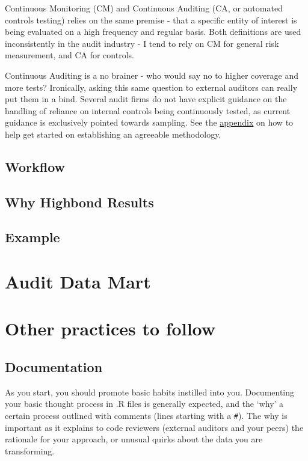 \documentclass[
]{book}
\begin{document}
Continuous Monitoring (CM) and Continuous Auditing (CA, or automated controls testing) relies on the same premise - that a specific entity of interest is being evaluated on a high frequency and regular basis. Both definitions are used inconsistently in the audit industry - I tend to rely on CM for general risk measurement, and CA for controls.

Continuous Auditing is a no brainer - who would say no to higher coverage and more tests? Ironically, asking this same question to external auditors can really put them in a bind. Several audit firms do not have explicit guidance on the handling of reliance on internal controls being continuously tested, as current guidance is exclusively pointed towards sampling. See the \protect\hyperlink{appendixct}{appendix} on how to help get started on establishing an agreeable methodology.

\hypertarget{workflow}{%
\section{Workflow}\label{workflow}}

\hypertarget{why-highbond-results}{%
\section{Why Highbond Results}\label{why-highbond-results}}

\hypertarget{example}{%
\section{Example}\label{example}}

\hypertarget{applied-adw}{%
\chapter{Audit Data Mart}\label{applied-adw}}

\hypertarget{other-practices-to-follow}{%
\chapter{Other practices to follow}\label{other-practices-to-follow}}

\hypertarget{documentation}{%
\section{Documentation}\label{documentation}}

As you start, you should promote basic habits instilled into you. Documenting your basic thought process in .R files is generally expected, and the `why' a certain process outlined with comments (lines starting with a \texttt{\#}). The why is important as it explains to code reviewers (external auditors and your peers) the rationale for your approach, or unusual quirks about the data you are transforming.
\end{document}
